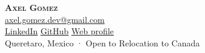 \begin{center}
    \textbf{\Huge \scshape Axel Gomez} \\ \vspace{3pt}
    \href{mailto:axel.gomez.dev@gmail.com}{ \underline{axel.gomez.dev@gmail.com}} \\
    \href{https://www.linkedin.com/in/axelgomez16}{ \underline{LinkedIn}} \quad
    \href{https://github.com/AxelGomez16}{ \underline{GitHub}} \quad
    \href{http://localhost:8000}{ \underline{Web profile}} \\
    \vspace{2pt}
    \footnotesize Queretaro, Mexico · Open to Relocation to Canada
\end{center}
